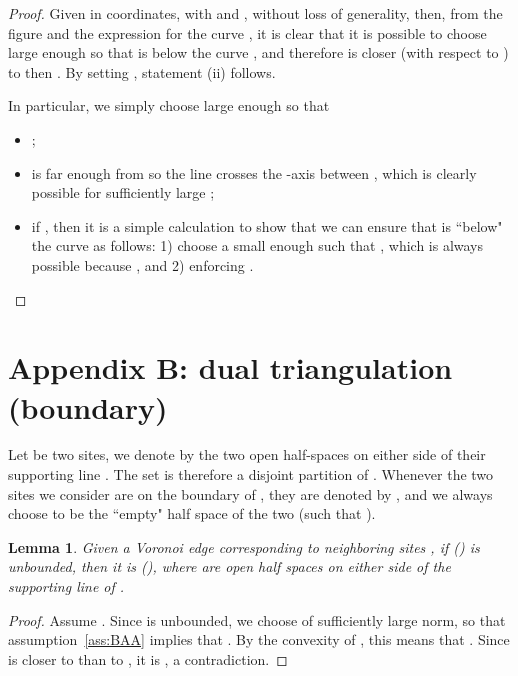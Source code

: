 \documentclass[11pt]{article}
\newtheorem{lemma}{Lemma}
\begin{document}
\begin{proof}
Given  in coordinates, with  and , without loss of generality, 
	then, from the figure and the expression for the curve , it is clear that it is 
	possible to choose  large enough so that  is below the curve , 
	and therefore  is closer (with respect to ) to  then . By setting , statement (ii) follows. 

In particular, we simply choose  large enough so that
\begin{itemize}
	\item ; 
	\item  is far enough from  so the line  crosses the -axis between 
		, which is clearly possible for sufficiently large ; 
	\item if , then it is a simple calculation to show that 
		we can ensure that  is ``below" the curve  as follows:
		1) choose a small enough  such that , 
		which is always possible because , 
		and 2) enforcing . 
\end{itemize}









\end{proof}












\section*{Appendix B: dual triangulation (boundary)}\label{app:boundary}

Let  be two sites, we denote by  
	the two open half-spaces on either side of their supporting line . 
The set  is therefore a disjoint partition of .
Whenever the two sites we consider are on the boundary of , 
	they are denoted by , 
	and we always choose  to be the ``empty" half space of the two 
	(such that ). 


\begin{lemma}\label{lem:halfspace}
    Given a Voronoi edge  
    	corresponding to neighboring sites , if  () is unbounded, then it is 
 (), 
where  are open half spaces on either side of the
supporting line of . 
\end{lemma}
\begin{proof}
Assume . 
Since  is unbounded, 
we choose  of sufficiently large norm, 
	so that assumption~\ref{ass:BAA} implies that . 
By the convexity of , this means that . 
Since  is closer to  than to , it is , a
contradiction. 
\end{proof}
\end{document}
